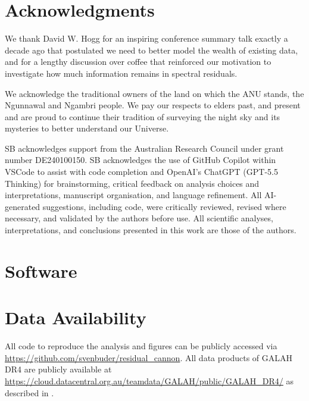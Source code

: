 \documentclass[twocolumn,apj,numberedappendix,appendixfloats]{openjournal}
\begin{document}
\section*{Acknowledgments}

We thank David W. Hogg for an inspiring conference summary talk exactly a decade ago that postulated we need to better model the wealth of existing data, and for a lengthy discussion over coffee that reinforced our motivation to investigate how much information remains in spectral residuals.

We acknowledge the traditional owners of the land on which the ANU stands, the Ngunnawal and Ngambri people. We pay our respects to elders past, and present and are proud to continue their tradition of surveying the night sky and its mysteries to better understand our Universe.

SB acknowledges support from the Australian Research Council under grant number DE240100150. SB acknowledges the use of GitHub Copilot within VSCode to assist with code completion and OpenAI's ChatGPT (GPT-5.5 Thinking) for brainstorming, critical feedback on analysis choices and interpretations, manuscript organisation, and language refinement. All AI-generated suggestions, including code, were critically reviewed, revised where necessary, and validated by the authors before use. All scientific analyses, interpretations, and conclusions presented in this work are those of the authors.

\section*{Software}



\section*{Data Availability}

All code to reproduce the analysis and figures can be publicly accessed via \url{https://github.com/svenbuder/residual_cannon}. All data products of GALAH DR4 are publicly available at \url{https://cloud.datacentral.org.au/teamdata/GALAH/public/GALAH_DR4/} as described in \citet{Buder2025b}.



\end{document}
